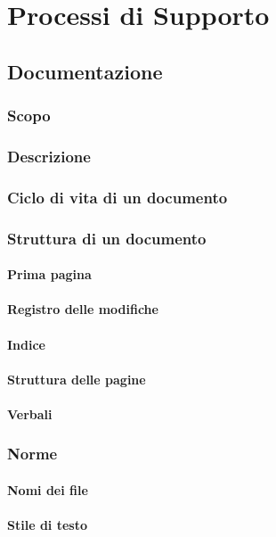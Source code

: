 \section{Processi di Supporto}
\subsection{Documentazione}
\subsubsection{Scopo}
\subsubsection{Descrizione}
\subsubsection{Ciclo di vita di un documento}
\subsubsection{Struttura di un documento}
\paragraph{Prima pagina}
\paragraph{Registro delle modifiche}
\paragraph{Indice}
\paragraph{Struttura delle pagine}
\paragraph{Verbali}
\subsubsection{Norme}
\paragraph{Nomi dei file}
\paragraph{Stile di testo}
